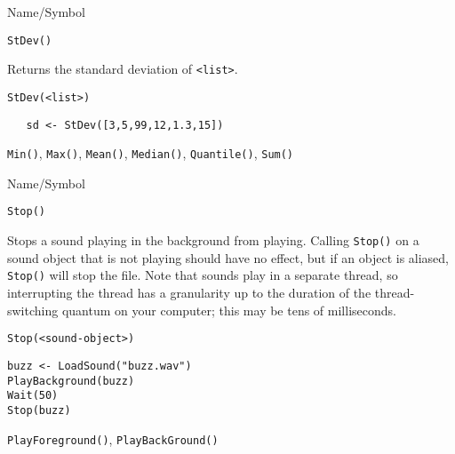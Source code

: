\begin{desc}{Name/Symbol}
\item[Name/Symbol]  	\verb+StDev()+ 

\item[Description]  Returns the standard deviation of \verb+<list>+.

\item[Usage]       	
\begin{verbatim}
StDev(<list>)        
\end{verbatim}

\item[Example]	
\begin{verbatim}
   sd <- StDev([3,5,99,12,1.3,15])        
\end{verbatim}

\item[See Also]     	\verb+Min()+, \verb+Max()+, \verb+Mean()+, \verb+Median()+, \verb+Quantile()+, \verb+Sum()+
\end{desc}

\rl




\begin{desc}{Name/Symbol}
\item[Name/Symbol]  	\verb+Stop()+	

\item[Description] Stops a sound playing in the background from
  playing.  Calling \verb+Stop()+ on a sound object that is not
  playing should have no effect, but if an object is aliased,
  \verb+Stop()+ will stop the file.  Note that sounds play in a
  separate thread, so interrupting the thread has a granularity up to
  the duration of the thread-switching quantum on your computer; this
  may be tens of milliseconds.

\item[Usage]
\begin{verbatim}
Stop(<sound-object>)
\end{verbatim}

\item[Example]     	
\begin{verbatim}
buzz <- LoadSound("buzz.wav")
PlayBackground(buzz)
Wait(50)
Stop(buzz)
\end{verbatim}

\item[See Also]    	\verb+PlayForeground()+, \verb+PlayBackGround()+
\end{desc}

\rl


